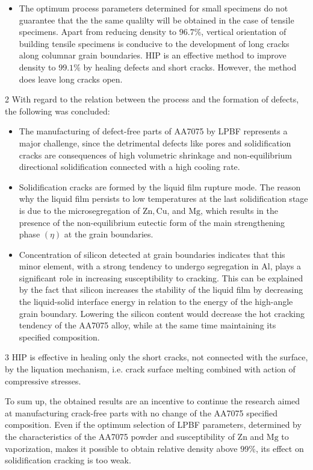 \documentclass[10pt]{article}
\begin{document}
\begin{itemize}
  \item The optimum process parameters determined for small specimens do not guarantee that the the same qualilty will be obtained in the case of tensile specimens. Apart from reducing density to $96.7 \%$, vertical orientation of building tensile specimens is conducive to the development of long cracks along columnar grain boundaries. HIP is an effective method to improve density to $99.1 \%$ by healing defects and short cracks. However, the method does leave long cracks open.
\end{itemize}

2 With regard to the relation between the process and the formation of defects, the following was concluded:

\begin{itemize}
  \item The manufacturing of defect-free parts of AA7075 by LPBF represents a major challenge, since the detrimental defects like pores and solidification cracks are consequences of high volumetric shrinkage and non-equilibrium directional solidification connected with a high cooling rate.
  \item Solidification cracks are formed by the liquid film rupture mode. The reason why the liquid film persists to low temperatures at the last solidification stage is due to the microsegregation of $\mathrm{Zn}, \mathrm{Cu}$, and $\mathrm{Mg}$, which results in the presence of the non-equilibrium eutectic form of the main strengthening phase $(\eta)$ at the grain boundaries.
  \item Concentration of silicon detected at grain boundaries indicates that this minor element, with a strong tendency to undergo segregation in $\mathrm{Al}$, plays a significant role in increasing susceptibility to cracking. This can be explained by the fact that silicon increases the stability of the liquid film by decreasing the liquid-solid interface energy in relation to the energy of the high-angle grain boundary. Lowering the silicon content would decrease the hot cracking tendency of the AA7075 alloy, while at the same time maintaining its specified composition.
\end{itemize}

3 HIP is effective in healing only the short cracks, not connected with the surface, by the liquation mechanism, i.e. crack surface melting combined with action of compressive stresses.

To sum up, the obtained results are an incentive to continue the research aimed at manufacturing crack-free parts with no change of the AA7075 specified composition. Even if the optimum selection of LPBF parameters, determined by the characteristics of the AA7075 powder and susceptibility of $\mathrm{Zn}$ and $\mathrm{Mg}$ to vaporization, makes it possible to obtain relative density above $99 \%$, its effect on solidification cracking is too weak.
\end{document}
